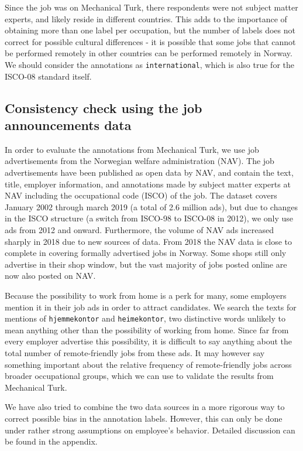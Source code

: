 \documentclass[11pt,]{article}
\begin{document}
Since the job was on Mechanical Turk, there respondents were not subject
matter experts, and likely reside in different countries. This adds to
the importance of obtaining more than one label per occupation, but the
number of labels does not correct for possible cultural differences - it
is possible that some jobs that cannot be performed remotely in other
countries can be performed remotely in Norway. We should consider the
annotations as \texttt{international}, which is also true for the
ISCO-08 standard itself.

\hypertarget{consistency-check-using-the-job-announcements-data}{%
\subsection{Consistency check using the job announcements
data}\label{consistency-check-using-the-job-announcements-data}}

In order to evaluate the annotations from Mechanical Turk, we use job
advertisements from the Norwegian welfare administration (NAV). The job
advertisements have been published as open data by NAV, and contain the
text, title, employer information, and annotations made by subject
matter experts at NAV including the occupational code (ISCO) of the job.
The dataset covers January 2002 through march 2019 (a total of 2.6
million ads), but due to changes in the ISCO structure (a switch from
ISCO-98 to ISCO-08 in 2012), we only use ads from 2012 and onward.
Furthermore, the volume of NAV ads increased sharply in 2018 due to new
sources of data. From 2018 the NAV data is close to complete in covering
formally advertised jobs in Norway. Some shops still only advertise in
their shop window, but the vast majority of jobs posted online are now
also posted on NAV.

Because the possibility to work from home is a perk for many, some
employers mention it in their job ads in order to attract candidates. We
search the texts for mentions of \texttt{hjemmekontor} and
\texttt{heimekontor}, two distinctive words unlikely to mean anything
other than the possibility of working from home. Since far from every
employer advertise this possibility, it is difficult to say anything
about the total number of remote-friendly jobs from these ads. It may
however say something important about the relative frequency of
remote-friendly jobs across broader occupational groups, which we can
use to validate the results from Mechanical Turk.

We have also tried to combine the two data sources in a more rigorous
way to correct possible bias in the annotation labels. However, this can
only be done under rather strong assumptions on employee's behavior.
Detailed discussion can be found in the appendix.
\end{document}
